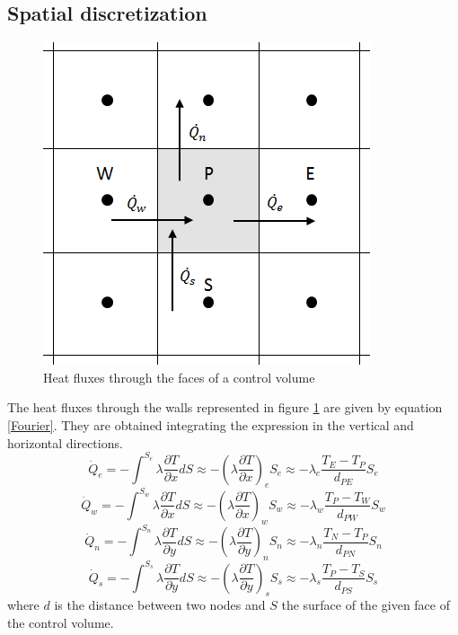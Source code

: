 \subsection{Spatial discretization}
\label{SpatialDiscretizationConduction}
\begin{figure}
	\centering
	\includegraphics[scale=0.7]{FourMaterials/controlvolume2d}
	\caption{Heat fluxes through the faces of a control volume}
	\label{convol2d}
\end{figure}
The heat fluxes through the walls represented in figure \ref{convol2d} are given by equation \ref{Fourier}. They are obtained integrating the expression in the vertical and horizontal directions.
\begin{equation}
\dot{Q}_{e}=-\int_{}^{S_{e}}\lambda\frac{\partial T}{\partial x}dS\approx-\left(\lambda\frac{\partial T}{\partial x}\right)_{e}S_{e}\approx-\lambda_{e}\frac{T_{E}-T_{P}}{d_{PE}}S_{e}
\end{equation}
\begin{equation}
\dot{Q}_{w}=-\int_{}^{S_{w}}\lambda\frac{\partial T}{\partial x}dS\approx-\left(\lambda\frac{\partial T}{\partial x}\right)_{w}S_{w}\approx-\lambda_{w}\frac{T_{P}-T_{W}}{d_{PW}}S_{w}
\end{equation}
\begin{equation}
\dot{Q}_{n}=-\int_{}^{S_{n}}\lambda\frac{\partial T}{\partial y}dS\approx-\left(\lambda\frac{\partial T}{\partial y}\right)_{n}S_{n}\approx-\lambda_{n}\frac{T_{N}-T_{P}}{d_{PN}}S_{n}
\end{equation}
\begin{equation}
\dot{Q}_{s}=-\int_{}^{S_{s}}\lambda\frac{\partial T}{\partial y}dS\approx-\left(\lambda\frac{\partial T}{\partial y}\right)_{s}S_{s}\approx-\lambda_{s}\frac{T_{P}-T_{S}}{d_{PS}}S_{s}
\end{equation}
where $d$ is the distance between two nodes and $S$ the surface of the given face of the control volume.

